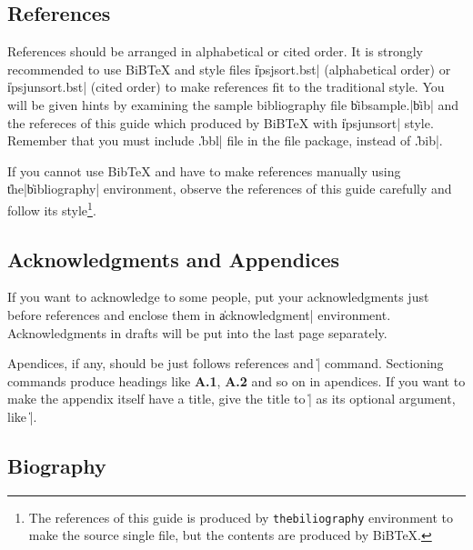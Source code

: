 
\subsection{References}

References should be arranged in alphabetical or cited order.  It is
strongly recommended to use BiB{\TeX} and style files \|ipsjsort.bst|
(alphabetical order) or \|ipsjunsort.bst| (cited order) to make references
fit to the traditional style.  You will be given hints by examining the
sample bibliography file \|bibsample.|\allowbreak\|bib| and the refereces of
this guide which produced by BiB{\TeX} with \|ipsjunsort| style.  Remember
that you must include \|.bbl| file in the file package, instead of \|.bib|.


If you cannot use Bib{\TeX} and have to make references manually using
\|the|{\tt\-}\|bibliography| environment, observe the references of this guide
carefully and follow its style\footnote{The references of this guide is
produced by {\tt thebiliography} environment to make the source single file,
but the contents are produced by BiB\TeX.}.


\subsection{Acknowledgments and Appendices}

If you want to acknowledge to some people, put your acknowledgments just
before references and enclose them in \|acknowledgment| environment.  
Acknowledgments in drafts will be put into the last page separately.

Apendices, if any, should be just follows references and \|\appendix|
command.  Sectioning commands produce headings like {\bf A.1}, {\bf A.2} and
so on in apendices.  If you want to make the appendix itself have a title,
give the title to \|\appendix| as its optional argument, like
\|\appendix[|\<title\>\|]|.


\subsection{Biography}

